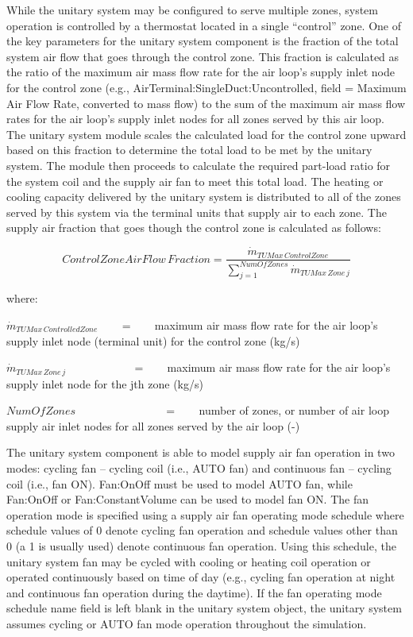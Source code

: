 While the unitary system may be configured to serve multiple zones, system operation is controlled by a thermostat located in a single ``control'' zone. One of the key parameters for the unitary system component is the fraction of the total system air flow that goes through the control zone. This fraction is calculated as the ratio of the maximum air mass flow rate for the air loop's supply inlet node for the control zone (e.g., AirTerminal:SingleDuct:Uncontrolled, field = Maximum Air Flow Rate, converted to mass flow) to the sum of the maximum air mass flow rates for the air loop's supply inlet nodes for all zones served by this air loop. The unitary system module scales the calculated load for the control zone upward based on this fraction to determine the total load to be met by the unitary system. The module then proceeds to calculate the required part-load ratio for the system coil and the supply air fan to meet this total load. The heating or cooling capacity delivered by the unitary system is distributed to all of the zones served by this system via the terminal units that supply air to each zone. The supply air fraction that goes though the control zone is calculated as follows:

\begin{equation}
Control Zone Air Flow\,Fraction = \frac{{{{\dot m}_{TUMax\,ControlZone}}}}{{\sum\limits_{j = 1}^{NumOfZones} {{{\dot m}_{TUMax\,Zone\,j}}} }}
\end{equation}

where:

\({\dot m_{TUMax\,ControlledZone}}\) ~~~ = ~~~ maximum air mass flow rate for the air loop's supply inlet node (terminal unit) for the control zone (kg/s)

\({\dot m_{TUMax\,Zone\,j}}\) ~~~~~~~~~~~ = ~~~ maximum air mass flow rate for the air loop's supply inlet node for the jth zone (kg/s)

\(NumOfZones\) ~~~~~~~~~~~~~~~ = ~~~ number of zones, or number of air loop supply air inlet nodes for all zones served by the air loop (-)

The unitary system component is able to model supply air fan operation in two modes: cycling fan -- cycling coil (i.e., AUTO fan) and continuous fan -- cycling coil (i.e., fan ON). Fan:OnOff must be used to model AUTO fan, while Fan:OnOff or Fan:ConstantVolume can be used to model fan ON. The fan operation mode is specified using a supply air fan operating mode schedule where schedule values of 0 denote cycling fan operation and schedule values other than 0 (a 1 is usually used) denote continuous fan operation. Using this schedule, the unitary system fan may be cycled with cooling or heating coil operation or operated continuously based on time of day (e.g., cycling fan operation at night and continuous fan operation during the daytime). If the fan operating mode schedule name field is left blank in the unitary system object, the unitary system assumes cycling or AUTO fan mode operation throughout the simulation.

